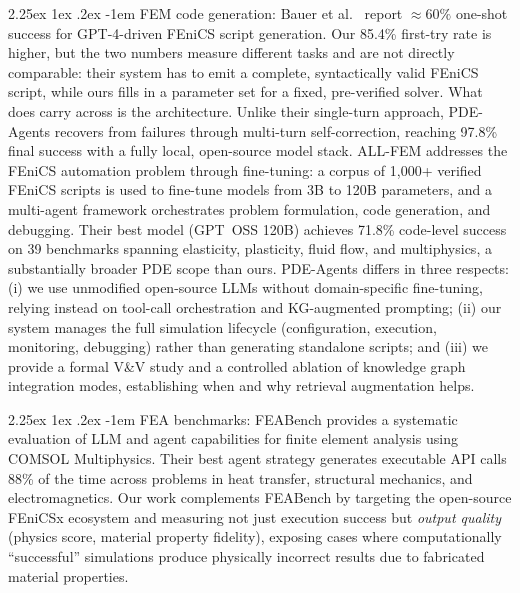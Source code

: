 \documentclass[preprint,review,12pt]{elsarticle}
\makeatletter
\renewcommand\paragraph{\@startsection{paragraph}{4}{\z@}%
  {2.25ex \@plus1ex \@minus.2ex}%
  {-1em}%
  {\normalfont\normalsize\bfseries}}
\newif\ifrevisionsvisible
\newcommand{\revised}[1]{%
  \ifrevisionsvisible\textcolor{revisionred}{#1}\else#1\fi}
\makeatother
\begin{document}
\paragraph{FEM code generation:}
Bauer et al.~\cite{bauer2023llm} report $\approx 60\%$ one-shot success for
GPT-4-driven FEniCS script generation.  \revised{Our 85.4\% first-try rate is
higher, but the two numbers measure different tasks and are not directly
comparable: their system has to emit a complete, syntactically valid
FEniCS script, while ours fills in a parameter set for a fixed,
pre-verified solver.  What does carry across is the architecture.  Unlike}
their single-turn approach, PDE-Agents recovers from failures through
multi-turn self-correction, reaching 97.8\% final success with a fully
local, open-source model stack.
ALL-FEM \citep{deotale2026allfem} addresses the FEniCS automation problem
through fine-tuning: a corpus of 1{,}000+ verified FEniCS scripts is
used to fine-tune models from 3B to 120B parameters, and a multi-agent
framework orchestrates problem formulation, code generation, and
debugging.  Their best model (GPT~OSS 120B) achieves 71.8\% code-level
success on 39 benchmarks spanning elasticity, plasticity, fluid flow,
and multiphysics, a substantially broader PDE scope than ours.
PDE-Agents differs in three respects: (i) we use unmodified
open-source LLMs without domain-specific fine-tuning, relying instead
on tool-call orchestration and KG-augmented prompting;
(ii) our system manages the full simulation lifecycle (configuration,
execution, monitoring, debugging) rather than generating standalone
scripts; and (iii) we provide a formal V\&V study and a controlled
ablation of knowledge graph integration modes, establishing when and
why retrieval augmentation helps.

\paragraph{FEA benchmarks:}
FEABench \citep{mudur2025feabench} provides a systematic evaluation of
LLM and agent capabilities for finite element analysis using COMSOL
Multiphysics.  Their best agent strategy generates executable API calls
88\% of the time across problems in heat transfer, structural mechanics,
and electromagnetics.  Our work complements FEABench by targeting the
open-source FEniCSx ecosystem and measuring not just execution success
but \emph{output quality} (physics score, material property fidelity),
exposing cases where computationally ``successful'' simulations produce
physically incorrect results due to fabricated material properties.
\end{document}
